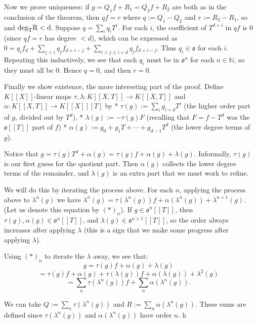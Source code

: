 Now we prove uniqueness: if $g=Q_1f+R_1=Q_2f+R_2$ are both as in the conclusion of the theorem, then $qf=r$ where $q:=Q_1-Q_2$ and $r:=R_2-R_1$, so and $\rm{deg}_TR<d$. Suppose $q=\sum_i q_i T^i$. For each $i$, the coefficient of $T^{d+i}$ in $qf$ is 0 (since $qf=r$ has degree $<d$), which can be expressed as $0=q_if_d+\sum_{j<i}q_jf_{d+i-j}+\sum_{i<j\le i+d}q_jf_{d+i-j}$. Thus $q_i\in \mathfrak{o}$ for each $i$. Repeating this inductively, we see that each $q_i$ must be in $\mathfrak{o}^n$ for each $n\in \mathbb{N}$, so they must all be $0$. Hence $q=0$, and then $r=0$.

Finally we show existence, the more interesting part of the proof. Define $K[[X]]$-linear maps $\tau,\lambda:K[[X,T]]\rightarrow K[[X,T]]$ and $\alpha:K[[X,T]]\rightarrow K[[X]][T]$ by 
* $\tau(g):=\sum_i g_{i+d} T^i$ (the higher order part of $g$, divided out by $T^d$),
* $\lambda(g):=-\tau(g)F$ (recalling that $F=f-T^d$ was the $\mathfrak{o}[[T]]$ part of $f$)
* $\alpha(g):=g_0+g_1T+\cdots+g_{d-1}T^d$ (the lower degree terms of $g$).

Notice that $g=\tau(g)T^d+\alpha(g)=\tau(g)f+\alpha(g)+\lambda(g)$. Informally, $\tau(g)$ is our first guess for the quotient part. Then $\alpha(g)$ collects the lower degree terms of the remainder, and $\lambda(g)$ is an extra part that we must work to refine. 

We will do this by iterating the process above. For each $n$, applying the process above to $\lambda^n(g)$ we have $\lambda^n(g)=\tau(\lambda^n(g))f+\alpha(\lambda^n(g))+\lambda^{n+1}(g)$. (Let us denote this equation by $(\ast)_n$). If $g\in \mathfrak{o}^n[[T]]$, then $\tau(g),\alpha(g)\in\mathfrak{o}^n[[T]]$, and $\lambda(g)\in\mathfrak{o}^{n+1}[[T]]$, so the order always increases after applying $\lambda$ (this is a sign that we make some progress after applying $\lambda$). 

Using $(\ast)_n$ to iterate the $\lambda$ away, we see that:
$$g=\tau(g)f+\alpha(g)+\lambda(g)$$
$$=\tau(g)f+\alpha(g)+\tau(\lambda(g))f+\alpha(\lambda(g))+\lambda^2(g)$$
$$=\sum_n\tau(\lambda^n(g))f+\sum_n\alpha(\lambda^n(g)).$$

We can take $Q:=\sum_n\tau(\lambda^n(g))$ and $R:=\sum_n\alpha(\lambda^n(g))$. These sums are defined since $\tau(\lambda^n(g))$ and $\alpha(\lambda^n(g))$ have order $n$.
h
